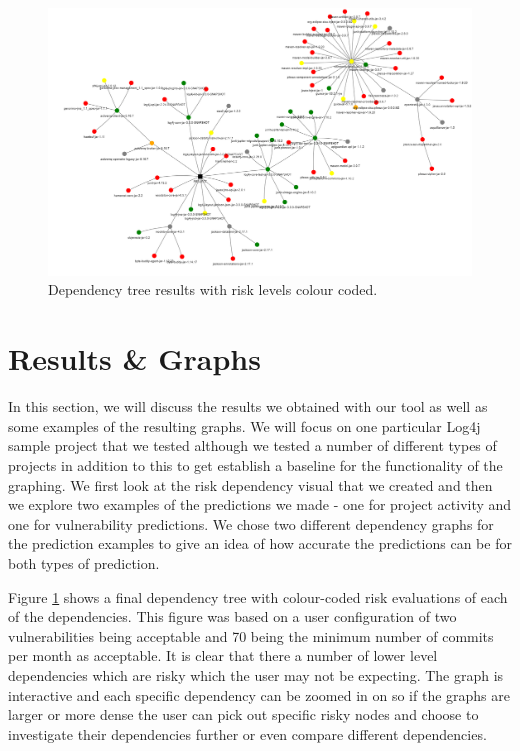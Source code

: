 \documentclass[conference]{IEEEtran}
\begin{document}
\begin{figure}
    \centering
    \includegraphics[scale=0.5]{dependency.png}
    \caption{Dependency tree results with risk levels colour coded.} 
    \label{fig:tree}
\end{figure}
\section{Results \& Graphs}

In this section, we will discuss the results we obtained with our tool as well as some examples of the resulting graphs. We will focus on one particular Log4j sample project \cite{noauthor_logging-log4j-sampleslog4j-server_nodate} that we tested although we tested a number of different types of projects in addition to this to get establish a baseline for the functionality of the graphing. We first look at the risk dependency visual that we created and then we explore two examples of the predictions we made - one for project activity and one for vulnerability predictions. We chose two different dependency graphs for the prediction examples to give an idea of how accurate the predictions can be for both types of prediction. 

Figure \ref{fig:tree} shows a final dependency tree with colour-coded risk evaluations of each of the dependencies. This figure was based on a user configuration of two vulnerabilities being acceptable and 70 being the minimum number of commits per month as acceptable. It is clear that there a number of lower level dependencies which are risky which the user may not be expecting. The graph is interactive and each specific dependency can be zoomed in on so if the graphs are larger or more dense the user can pick out specific risky nodes and choose to investigate their dependencies further or even compare different dependencies. 
\end{document}

